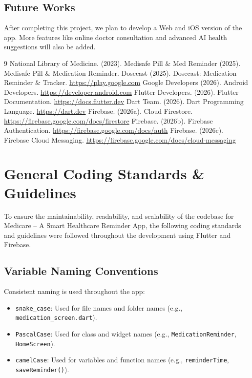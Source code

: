 \documentclass[12pt, a4paper, oneside]{report}
\begin{document}
\section{Future Works}
After completing this project, we plan to develop a Web and iOS version of the app. More features like online doctor consultation and advanced AI health suggestions will also be added.


\newpage
{}
\begin{thebibliography}{9}
 National Library of Medicine. (2023).
 Medisafe Pill \& Med Reminder (2025). Medisafe Pill \& Medication Reminder.
 Dosecast (2025). Dosecast: Medication Reminder \& Tracker. \url{https://play.google.com}
 Google Developers (2026). Android Developers. \url{https://developer.android.com}
 Flutter Developers. (2026). Flutter Documentation. \url{https://docs.flutter.dev}
 Dart Team. (2026). Dart Programming Language. \url{https://dart.dev}
 Firebase. (2026a). Cloud Firestore. \url{https://firebase.google.com/docs/firestore}
 Firebase. (2026b). Firebase Authentication. \url{https://firebase.google.com/docs/auth}
 Firebase. (2026c). Firebase Cloud Messaging. \url{https://firebase.google.com/docs/cloud-messaging}
\end{thebibliography}

\appendix
\chapter{General Coding Standards \& Guidelines}
\label{app:coding-standards}

To ensure the maintainability, readability, and scalability of the codebase for Medicare -- A Smart Healthcare Reminder App, the following coding standards and guidelines were followed throughout the development using Flutter and Firebase.

\section{Variable Naming Conventions}
Consistent naming is used throughout the app:
\begin{itemize}
    \item \texttt{snake\_case}: Used for file names and folder names (e.g., \texttt{medication\_screen.dart}).
    \item \texttt{PascalCase}: Used for class and widget names (e.g., \texttt{MedicationReminder}, \texttt{HomeScreen}).
    \item \texttt{camelCase}: Used for variables and function names (e.g., \texttt{reminderTime}, \texttt{saveReminder()}).
\end{itemize}
\end{document}
